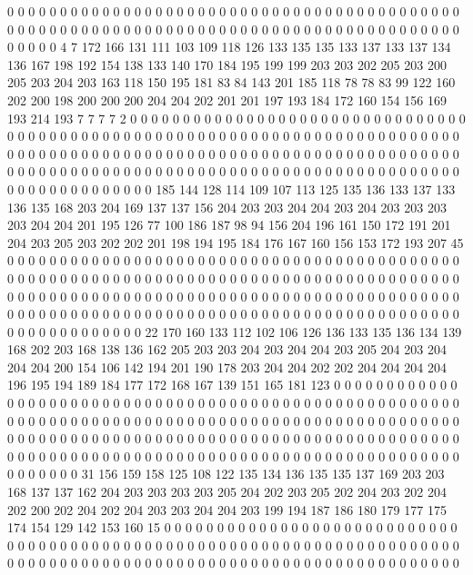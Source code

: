 0 0 0 0 0 0 0 0 0 0 0 0 0 0 0 0 0 0 0 0
0 0 0 0 0 0 0 0 0 0 0 0 0 0 0 0 0 0 0 0
0 0 0 0 0 0 0 0 0 0 0 0 0 0 0 0 0 0 0 0
0 0 0 0 0 0 0 0 0 0 0 0 0 0 0 0 0 0 0 0
0 0 0 0 0 0 0 0 0 0 0 4 7 172 166 131 111 103 109 118
126 133 135 135 133 137 133 137 134 136 167 198 192 154 138 133 140 170 184 195
199 199 203 203 202 205 203 200 205 203 204 203 163 118 150 195 181 83 84 143
201 185 118 78 78 83 99 122 160 202 200 198 200 200 200 204 204 202 201 201
197 193 184 172 160 154 156 169 193 214 193 7 7 7 7 2 0 0 0 0
0 0 0 0 0 0 0 0 0 0 0 0 0 0 0 0 0 0 0 0
0 0 0 0 0 0 0 0 0 0 0 0 0 0 0 0 0 0 0 0
0 0 0 0 0 0 0 0 0 0 0 0 0 0 0 0 0 0 0 0
0 0 0 0 0 0 0 0 0 0 0 0 0 0 0 0 0 0 0 0
0 0 0 0 0 0 0 0 0 0 0 0 0 0 0 0 0 0 0 0
0 0 0 0 0 0 0 0 0 0 0 0 0 0 0 0 0 0 0 0
0 0 0 0 0 0 0 0 0 0 0 0 0 0 0 0 0 0 0 0
0 0 0 0 0 0 0 0 0 0 0 0 0 0 0 0 0 0 0 0
0 0 0 0 0 0 0 0 0 0 0 185 144 128 114 109 107 113 125 135
136 133 137 133 136 135 168 203 204 169 137 137 156 204 203 203 204 204 203 204
203 203 203 203 204 204 201 195 126 77 100 186 187 98 94 156 204 196 161 150
172 191 201 204 203 205 203 202 202 201 198 194 195 184 176 167 160 156 153 172
193 207 45 0 0 0 0 0 0 0 0 0 0 0 0 0 0 0 0 0
0 0 0 0 0 0 0 0 0 0 0 0 0 0 0 0 0 0 0 0
0 0 0 0 0 0 0 0 0 0 0 0 0 0 0 0 0 0 0 0
0 0 0 0 0 0 0 0 0 0 0 0 0 0 0 0 0 0 0 0
0 0 0 0 0 0 0 0 0 0 0 0 0 0 0 0 0 0 0 0
0 0 0 0 0 0 0 0 0 0 0 0 0 0 0 0 0 0 0 0
0 0 0 0 0 0 0 0 0 0 0 0 0 0 0 0 0 0 0 0
0 0 0 0 0 0 0 0 0 0 0 0 0 0 0 0 0 0 0 0
0 0 0 0 0 0 0 0 0 0 0 0 0 0 0 0 0 0 0 0
0 0 0 0 0 0 0 0 22 170 160 133 112 102 106 126 136 133 135 136
134 139 168 202 203 168 138 136 162 205 203 203 204 203 204 204 203 205 204 203
204 204 204 200 154 106 142 194 201 190 178 203 204 204 202 202 204 204 204 204
196 195 194 189 184 177 172 168 167 139 151 165 181 123 0 0 0 0 0 0
0 0 0 0 0 0 0 0 0 0 0 0 0 0 0 0 0 0 0 0
0 0 0 0 0 0 0 0 0 0 0 0 0 0 0 0 0 0 0 0
0 0 0 0 0 0 0 0 0 0 0 0 0 0 0 0 0 0 0 0
0 0 0 0 0 0 0 0 0 0 0 0 0 0 0 0 0 0 0 0
0 0 0 0 0 0 0 0 0 0 0 0 0 0 0 0 0 0 0 0
0 0 0 0 0 0 0 0 0 0 0 0 0 0 0 0 0 0 0 0
0 0 0 0 0 0 0 0 0 0 0 0 0 0 0 0 0 0 0 0
0 0 0 0 0 0 0 0 0 0 0 0 0 0 0 0 0 0 0 0
0 0 0 0 0 0 0 0 0 0 0 0 0 0 0 0 0 0 0 0
0 0 0 0 0 31 156 159 158 125 108 122 135 134 136 135 135 137 169 203
203 168 137 137 162 204 203 203 203 203 205 204 202 203 205 202 204 203 202 204
202 200 202 204 202 204 203 203 204 204 203 199 194 187 186 180 179 177 175 174
154 129 142 153 160 15 0 0 0 0 0 0 0 0 0 0 0 0 0 0
0 0 0 0 0 0 0 0 0 0 0 0 0 0 0 0 0 0 0 0
0 0 0 0 0 0 0 0 0 0 0 0 0 0 0 0 0 0 0 0
0 0 0 0 0 0 0 0 0 0 0 0 0 0 0 0 0 0 0 0
0 0 0 0 0 0 0 0 0 0 0 0 0 0 0 0 0 0 0 0
0 0 0 0 0 0 0 0 0 0 0 0 0 0 0 0 0 0 0 0
